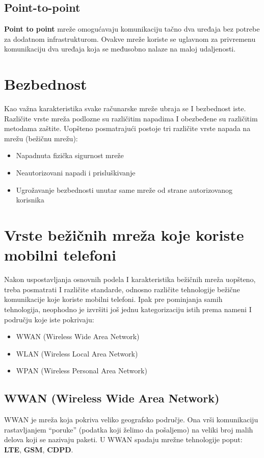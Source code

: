 \documentclass[a4paper]{article}
\begin{document}
{    \subsection{Point-to-point}
\textbf{Point to point} mreže omogućavaju komunikaciju tačno dva uređaja bez potrebe za dodatnom infrastrukturom. Ovakve mreže koriste se uglavnom za privremenu komunikaciju dva uređaja koja se međusobno nalaze na maloj udaljenosti.

\section{Bezbednost}	
\label{sec:Bezbednost}

Kao važna karakteristika svake računarske mreže ubraja se I bezbednost iste. Različite vrste mreža podlozne su različitim napadima I obezbeđene su različitim metodama zaštite.
Uopšteno posmatrajući postoje tri različite vrste napada na mrežu (bežičnu mrežu):

\begin{itemize}
    \item Napadnuta fizička sigurnost mreže
    \item Neautorizovani napadi i prisluškivanje
    \item Ugrožavanje bezbednosti unutar same mreže od strane autorizovanog korisnika
\end{itemize}


\section{Vrste bežičnih mreža koje koriste mobilni telefoni}
\label{vrste_mreza_na_telefonu}

Nakon uspostavljanja osnovnih podela I karakteristika bežičnih mreža uopšteno, treba posmatrati I različite standarde, odnosno različite tehnologije bežične komunikacije koje koriste mobilni telefoni. Ipak pre pominjanja samih tehnologija, neophodno je izvršiti još jednu kategorizaciju istih prema nameni I području koje iste pokrivaju:

\begin{itemize}
    \item WWAN (Wireless Wide Area Network)
    \item WLAN (Wireless Local Area Network)
    \item WPAN (Wireless Personal Area Network)
\end{itemize}
    \subsection{WWAN (Wireless Wide Area Network)}
WWAN je mreža koja pokriva veliko geografsko područje. Ona vrši komunikaciju rastavljanjem “poruke” (podatka koji želimo da pošaljemo) na veliki broj malih delova koji se nazivaju paketi. U WWAN spadaju mrežne tehnologije poput: \textbf{LTE}, \textbf{GSM}, \textbf{CDPD}. 
}
\end{document}
